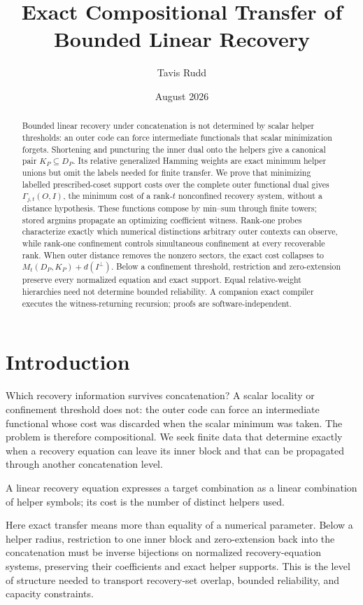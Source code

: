 \documentclass[11pt]{article}
\title{Exact Compositional Transfer of Bounded Linear Recovery}
\author{Tavis Rudd}
\date{August 2026}
\theoremstyle{definition}
\begin{document}
\maketitle

\begin{abstract}
Bounded linear recovery under concatenation is not determined by scalar helper
thresholds: an outer code can force intermediate functionals that scalar
minimization forgets.  Shortening and puncturing the inner dual onto the
helpers give a canonical pair $K_P\subseteq D_P$.  Its relative generalized
Hamming weights are exact minimum helper unions but omit the labels needed for
finite transfer.  We prove that minimizing labelled prescribed-coset
support costs over the complete outer functional dual gives
$\Gamma_{j,t}(O,I)$, the minimum cost of a rank-$t$ nonconfined recovery
system, without a distance hypothesis.  These functions compose by min--sum
through finite towers; stored argmins propagate an optimizing coefficient
witness.  Rank-one probes characterize exactly which numerical distinctions
arbitrary outer contexts can observe, while rank-one confinement controls simultaneous
confinement at every recoverable rank.  When outer distance removes the nonzero sectors,
the exact cost collapses to $M_t(D_P,K_P)+d(I^\perp)$.  Below a confinement
threshold, restriction and zero-extension preserve every normalized equation
and exact support.  Equal relative-weight hierarchies need not determine
bounded reliability.  A companion exact compiler executes the
witness-returning recursion; proofs are software-independent.
\end{abstract}

\section{Introduction}

Which recovery information survives concatenation?  A scalar locality or
confinement threshold does not: the outer code can force an intermediate
functional whose cost was discarded when the scalar minimum was taken.  The
problem is therefore compositional.  We seek finite data that determine
exactly when a recovery equation can leave its inner block and that can be
propagated through another concatenation level.

A linear recovery equation expresses a target combination as a linear
combination of helper symbols; its cost is the number of distinct helpers used.

Here exact transfer means more than equality of a numerical parameter.  Below
a helper radius, restriction to one inner block and zero-extension back into
the concatenation must be inverse bijections on normalized recovery-equation
systems, preserving their coefficients and exact helper supports.  This is the
level of structure needed to transport recovery-set overlap, bounded
reliability, and capacity constraints.
\end{document}
